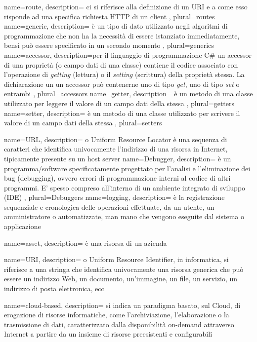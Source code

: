  {
	name=route,
	description={ ci si riferisce alla definizione di un URI e a come esso risponde ad una specifica richiesta HTTP di un client
	},
	plural=routes
}
 {
	name=generic,
	description={ è un tipo di dato utilizzato negli algoritmi di programmazione che non ha la necessità di essere istanziato immediatamente, bensì può essere specificato in un secondo momento
	},
	plural=generics
}
 {
	name=accessor,
	description={per il linguaggio di programmazione C\# un accessor di una proprietà (o campo dati di una classe) contiene il codice associato con l'operazione di \textit{getting} (lettura) o il \textit{setting} (scrittura) della proprietà stessa. La dichiarazione un un accessor può contenerne uno di tipo \textit{get}, uno di tipo \textit{set} o entrambi
	},
	plural=accessors
}
 {
	name=getter,
	description={ è un metodo di una classe utilizzato per leggere il valore di un campo dati della stessa
	},
	plural=getters
}
 {
	name=setter,
	description={ è un metodo di una classe utilizzato per scrivere il valore di un campo dati della stessa
	},
	plural=setters
}

 {
	name={URL},
	description={ o Uniform Resource Locator è una sequenza di caratteri che identifica univocamente l'indirizzo di una risorsa in Internet, tipicamente presente su un host server
	}
}
 {
	name=Debugger,
	description={ è un programma/software specificatamente progettato per l'analisi e l'eliminazione dei bug (debugging), ovvero errori di programmazione interni al codice di altri programmi. E' spesso compreso all'interno di un ambiente integrato di sviluppo (IDE)
	},
	plural=Debuggers
}
 {
	name=logging,
	description={ è la registrazione sequenziale e cronologica delle operazioni effettuate, da un utente, un amministratore o automatizzate, man mano che vengono eseguite dal sistema o applicazione
	}
}

 {
	name=asset,
	description={ è una risorsa di un azienda
	}
}


 {
	name={URI},
	description={ o Uniform Resource Identifier, in informatica, si riferisce a una stringa che identifica univocamente una risorsa generica che può essere un indirizzo Web, un documento, un'immagine, un file, un servizio, un indirizzo di posta elettronica, ecc
	}
}

 {
	name=cloud-based,
	description={ si indica un paradigma basato, sul Cloud, di erogazione di risorse informatiche, come l'archiviazione, l'elaborazione o la trasmissione di dati, caratterizzato dalla disponibilità on-demand attraverso Internet a partire da un insieme di risorse preesistenti e configurabili
	}
}

